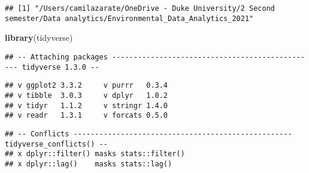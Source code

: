 \documentclass[
]{article}
\newenvironment{Shaded}{\begin{snugshade}}{\end{snugshade}}
\newcommand{\CommentTok}[1]{\textcolor[rgb]{0.56,0.35,0.01}{\textit{#1}}}
\newcommand{\DataTypeTok}[1]{\textcolor[rgb]{0.13,0.29,0.53}{#1}}
\newcommand{\KeywordTok}[1]{\textcolor[rgb]{0.13,0.29,0.53}{\textbf{#1}}}
\newcommand{\NormalTok}[1]{#1}
\newcommand{\OperatorTok}[1]{\textcolor[rgb]{0.81,0.36,0.00}{\textbf{#1}}}
\newcommand{\OtherTok}[1]{\textcolor[rgb]{0.56,0.35,0.01}{#1}}
\newcommand{\StringTok}[1]{\textcolor[rgb]{0.31,0.60,0.02}{#1}}
\begin{document}
\begin{Shaded}
\end{Shaded}

\begin{verbatim}
## [1] "/Users/camilazarate/OneDrive - Duke University/2 Second semester/Data analytics/Environmental_Data_Analytics_2021"
\end{verbatim}

\begin{Shaded}
\begin{Highlighting}[]
\KeywordTok{library}\NormalTok{(tidyverse)}
\end{Highlighting}
\end{Shaded}

\begin{verbatim}
## -- Attaching packages ------------------------------------------------ tidyverse 1.3.0 --
\end{verbatim}

\begin{verbatim}
## v ggplot2 3.3.2     v purrr   0.3.4
## v tibble  3.0.3     v dplyr   1.0.2
## v tidyr   1.1.2     v stringr 1.4.0
## v readr   1.3.1     v forcats 0.5.0
\end{verbatim}

\begin{verbatim}
## -- Conflicts --------------------------------------------------- tidyverse_conflicts() --
## x dplyr::filter() masks stats::filter()
## x dplyr::lag()    masks stats::lag()
\end{verbatim}

\begin{Shaded}
\end{Shaded}
\end{document}
